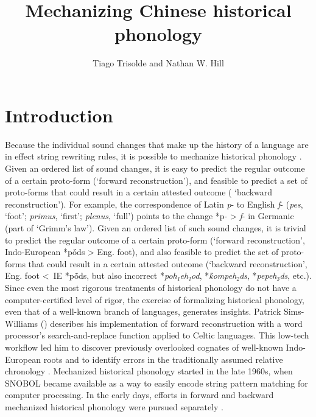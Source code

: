 \documentclass[xetex, svgnames, 12pt]{scrartcl}
\title{Mechanizing Chinese historical phonology 
}
\author{Tiago Trisolde and Nathan W. Hill}
\newcounter{para}
\begin{document}
\maketitle
\begin{abstract}

\end{abstract}

\section{Introduction}
Because the individual sound changes that make up the history of a language are in effect string rewriting rules, it is possible to mechanize historical phonology \citep{Sims-Williams2018mechanising}. 
Given an ordered list of sound changes, it is easy to predict the regular outcome of a certain proto-form (`forward reconstruction'), and feasible  to predict a set of proto-forms that could result in a certain attested outcome ( `backward reconstruction'). For example, the correspondence of Latin \textit{p}- to English \textit{f}- (\textit{pes}, `foot'; \textit{primus}, `first'; \textit{plenus}, `full') points to the change *p- > \textit{f}- in Germanic (part of  `Grimm's law'). Given an ordered list of such sound changes, it is trivial to predict the regular outcome of a certain proto-form (`forward reconstruction', Indo-European *pṓds > Eng. foot), and also feasible to predict the set of proto-forms that could result in a certain attested outcome (`backward reconstruction', Eng. foot < IE *pṓds, but also incorrect *\textit{poh₁eh₁od}, *\textit{ḱompeh₂ds}, *\textit{pepeh₃ds}, etc.). Since even the most rigorous treatments of historical phonology do not have a computer-certified level of rigor, the exercise of formalizing historical phonology, even that of a well-known branch of languages, generates insights. Patrick Sims-Williams (\citeyear[9]{Sims-Williams2018mechanising}) describes his implementation of forward reconstruction with a word processor's search-and-replace function applied to Celtic languages. 
This low-tech workflow led him to discover previously overlooked cognates of well-known Indo-European roots 
\citep{Sims-Williams2018pierce} 
and to identify errors in the traditionally assumed relative chronology \citep{Sims-Williams2007CommonCeltic}.
Mechanized historical phonology started in the late 1960s, when SNOBOL became available as a way to easily encode string pattern matching for computer processing. In the early days, efforts in forward and backward mechanized historical phonology were pursued separately
\citep{Sims-Williams2018mechanising}. 
\end{document}
